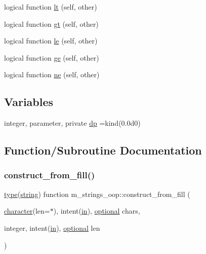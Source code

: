 \begin{DoxyCompactItemize}
logical function \hyperlink{namespacem__strings__oop_a332288f9bebc563e12671b514512eb30}{lt} (self, other)
\item 
logical function \hyperlink{namespacem__strings__oop_a25beb184587d7c9fc0a3fd846d4ce187}{gt} (self, other)
\item 
logical function \hyperlink{namespacem__strings__oop_a103e7c1fab92a1c4cbfff87ec8cd1e23}{le} (self, other)
\item 
logical function \hyperlink{namespacem__strings__oop_a2d31ec44898046ba97aebc0de32de19a}{ge} (self, other)
\item 
logical function \hyperlink{namespacem__strings__oop_aa424e1eccc45bb143172d6e212f8e408}{ne} (self, other)
\end{DoxyCompactItemize}
\subsection*{Variables}
\begin{DoxyCompactItemize}
\item 
integer, parameter, private \hyperlink{namespacem__strings__oop_aff89e0d0502f39fedc4f8a9cf793fdba}{dp} =kind(0.\+0d0)
\end{DoxyCompactItemize}


\subsection{Function/\+Subroutine Documentation}
\mbox{\label{namespacem__strings__oop_a411874cce2f16fee4d05d7528b510703}} 
\subsubsection{\texorpdfstring{construct\+\_\+from\+\_\+fill()}{construct\_from\_fill()}}
{\footnotesize\ttfamily \hyperlink{stop__watch_83_8txt_a70f0ead91c32e25323c03265aa302c1c}{type}(\hyperlink{structm__strings__oop_1_1string}{string}) function m\+\_\+strings\+\_\+oop\+::construct\+\_\+from\+\_\+fill (\begin{DoxyParamCaption}\item[{\hyperlink{option__stopwatch_83_8txt_abd4b21fbbd175834027b5224bfe97e66}{character}(len=$\ast$), intent(\hyperlink{M__journal_83_8txt_afce72651d1eed785a2132bee863b2f38}{in}), \hyperlink{option__stopwatch_83_8txt_aa4ece75e7acf58a4843f70fe18c3ade5}{optional}}]{chars,  }\item[{integer, intent(\hyperlink{M__journal_83_8txt_afce72651d1eed785a2132bee863b2f38}{in}), \hyperlink{option__stopwatch_83_8txt_aa4ece75e7acf58a4843f70fe18c3ade5}{optional}}]{len }\end{DoxyParamCaption})\hspace{0.3cm}{\ttfamily [private]}}

